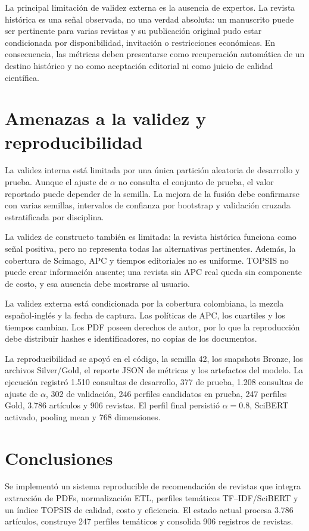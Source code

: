 \documentclass[12pt,a4paper]{article}
\begin{document}
La principal limitación de validez externa es la ausencia de expertos. La revista histórica es una señal observada, no una verdad absoluta: un manuscrito puede ser pertinente para varias revistas y su publicación original pudo estar condicionada por disponibilidad, invitación o restricciones económicas. En consecuencia, las métricas deben presentarse como recuperación automática de un destino histórico y no como aceptación editorial ni como juicio de calidad científica.

\section{Amenazas a la validez y reproducibilidad}
La validez interna está limitada por una única partición aleatoria de desarrollo y prueba. Aunque el ajuste de $\alpha$ no consulta el conjunto de prueba, el valor reportado puede depender de la semilla. La mejora de la fusión debe confirmarse con varias semillas, intervalos de confianza por bootstrap y validación cruzada estratificada por disciplina.

La validez de constructo también es limitada: la revista histórica funciona como señal positiva, pero no representa todas las alternativas pertinentes. Además, la cobertura de Scimago, APC y tiempos editoriales no es uniforme. TOPSIS no puede crear información ausente; una revista sin APC real queda sin componente de costo, y esa ausencia debe mostrarse al usuario.

La validez externa está condicionada por la cobertura colombiana, la mezcla español-inglés y la fecha de captura. Las políticas de APC, los cuartiles y los tiempos cambian. Los PDF poseen derechos de autor, por lo que la reproducción debe distribuir hashes e identificadores, no copias de los documentos.

La reproducibilidad se apoyó en el código, la semilla 42, los snapshots Bronze, los archivos Silver/Gold, el reporte JSON de métricas y los artefactos del modelo. La ejecución registró 1.510 consultas de desarrollo, 377 de prueba, 1.208 consultas de ajuste de $\alpha$, 302 de validación, 246 perfiles candidatos en prueba, 247 perfiles Gold, 3.786 artículos y 906 revistas. El perfil final persistió $\alpha=0.8$, SciBERT activado, pooling mean y 768 dimensiones.

\section{Conclusiones}
Se implementó un sistema reproducible de recomendación de revistas que integra extracción de PDFs, normalización ETL, perfiles temáticos TF--IDF/SciBERT y un índice TOPSIS de calidad, costo y eficiencia. El estado actual procesa 3.786 artículos, construye 247 perfiles temáticos y consolida 906 registros de revistas.
\end{document}
